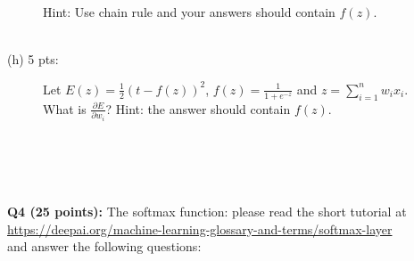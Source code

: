 \documentclass[11pt]{article}
\begin{document}
\begin{description}
       
       Hint: Use chain rule and your answers should contain $f(z)$. \\ \\

\item [(h) 5 pts:] Let $E(z)=\frac{1}{2}(t - f(z))^2$,
  $f(z)=\frac{1}{1+e^{-z}}$ and $z = \sum_{i=1}^n w_i x_i$. \\
  
  What is $\frac{\partial E}{\partial w_i}$? Hint: the answer should contain $f(z)$. \\ \\ \\ \\ \\ 
\end{description}


  
\vspace{0.4 in}
\noindent
{\bf Q4 (25 points):} The softmax function: please read the short tutorial at \\
\url{https://deepai.org/machine-learning-glossary-and-terms/softmax-layer} \\
and answer the following questions:
    
\end{document}
